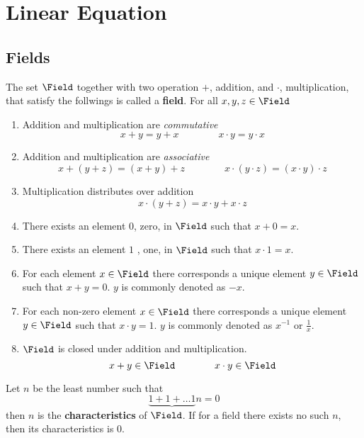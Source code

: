 \chapter{Linear Equation}
\thispagestyle{headings}
\section{Fields}
The set \(\Field\) together with two operation \(+\), addition, and \(\cdot\), multiplication, that satisfy the follwings is called a \textbf{field}. For all \(x,y,z \in \Field\)
\begin{enumerate}
    \item Addition and multiplication are \textit{commutative}
          \[ x + y = y + x \qquad \qquad x \cdot y = y \cdot x\]
    \item Addition and multiplication are \textit{associative}
          \[x + (y + z) = (x + y) + z \qquad \qquad x \cdot (y \cdot z) = (x \cdot y) \cdot z\]
    \item Multiplication distributes over addition
          \[x \cdot (y + z)  = x \cdot y +  x \cdot z\]
    \item There exists an element \(0\), zero, in \(\Field\) such that \(x + 0 = x\).
    \item There exists an element \(1\) , one, in \(\Field\) such that \(x \cdot 1 = x\).
    \item For each element \(x \in \Field\) there corresponds a unique element \( y \in \Field\) such that \(x + y  = 0\). \(y\) is commonly denoted as \(-x\).
    \item For each non-zero element \(x \in \Field\) there corresponds a unique element \( y \in \Field\) such that \(x \cdot y  = 1\). \(y\) is commonly denoted as \(x^{-1}\) or \(\frac{1}{x}\).
    \item \(\Field\) is closed under addition and multiplication.
          \[x + y \in \Field \qquad \qquad x \cdot y \in \Field\]
\end{enumerate}

\begin{definition} [Characteristics]
    Let \(n\) be the least number such that
    \begin{equation}
        \underbrace{1 + 1 + \dots 1}{n} = 0
    \end{equation}
    then \(n\) is the \textbf{characteristics} of \(\Field\). If for a field there exists no such \(n\), then its characteristics is \(0\).
\end{definition}

